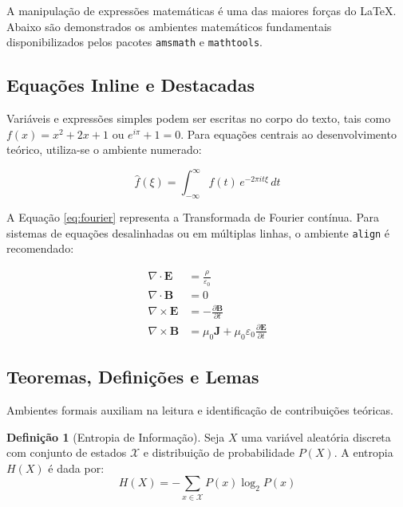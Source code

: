\documentclass[11pt, a4paper]{article}
\theoremstyle{definition}
\newtheorem{definition}{Definição}[section]
\theoremstyle{remark}
\begin{document}
A manipulação de expressões matemáticas é uma das maiores forças do {\LaTeX}. Abaixo são demonstrados os ambientes matemáticos fundamentais disponibilizados pelos pacotes \texttt{amsmath} e \texttt{mathtools}.

\subsection{Equações Inline e Destacadas}

Variáveis e expressões simples podem ser escritas no corpo do texto, tais como $f(x) = x^2 + 2x + 1$ ou $e^{i\pi} + 1 = 0$. Para equações centrais ao desenvolvimento teórico, utiliza-se o ambiente numerado:

\begin{equation}
    \label{eq:fourier}
    \hat{f}(\xi) = \int_{-\infty}^{\infty} f(t) \, e^{-2\pi i t \xi} \, dt
\end{equation}

A Equação \ref{eq:fourier} representa a Transformada de Fourier contínua. Para sistemas de equações desalinhadas ou em múltiplas linhas, o ambiente \texttt{align} é recomendado:

\begin{align}
    \nabla \cdot \mathbf{E} &= \frac{\rho}{\varepsilon_0} \label{eq:maxwell1} \\
    \nabla \cdot \mathbf{B} &= 0 \label{eq:maxwell2} \\
    \nabla \times \mathbf{E} &= -\frac{\partial \mathbf{B}}{\partial t} \label{eq:maxwell3} \\
    \nabla \times \mathbf{B} &= \mu_0 \mathbf{J} + \mu_0 \varepsilon_0 \frac{\partial \mathbf{E}}{\partial t} \label{eq:maxwell4}
\end{align}

\subsection{Teoremas, Definições e Lemas}

Ambientes formais auxiliam na leitura e identificação de contribuições teóricas.

\begin{definition}[Entropia de Informação]
\label{def:entropia}
Seja $X$ uma variável aleatória discreta com conjunto de estados $\mathcal{X}$ e distribuição de probabilidade $P(X)$. A entropia $H(X)$ é dada por:
\begin{equation}
    H(X) = -\sum_{x \in \mathcal{X}} P(x) \log_2 P(x)
\end{equation}
\end{definition}
\end{document}
